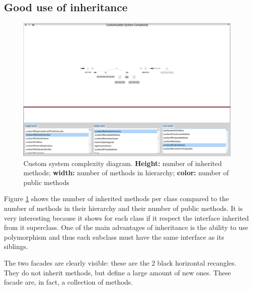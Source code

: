 \subsection{Good use of inheritance}
\begin{figure}[H]
    \includegraphics[width=\textwidth]{numberofmethods2.png}
    \caption{\label{fig:numberofmethods} Custom system complexity diagram. \textbf{Height:} number of inherited methods; \textbf{width:} number of methods in hierarchy; \textbf{color:} number of public methods}
\end{figure}

Figure \ref{fig:numberofmethods} shows the number of inherited methods per class compared to the number of methods in their hierarchy and their number of public methods.
It is very interesting because it shows for each class if it respect the interface inherited from it superclass. One of the main advantages of inheritance is the ability to use polymorphism and thus each subclass must have the same interface as its siblings.

The two facades are clearly visible: these are the 2 black horizontal recangles. They do not inherit methods, but define a large amount of new ones. These facade are, in fact, a collection of methods.


